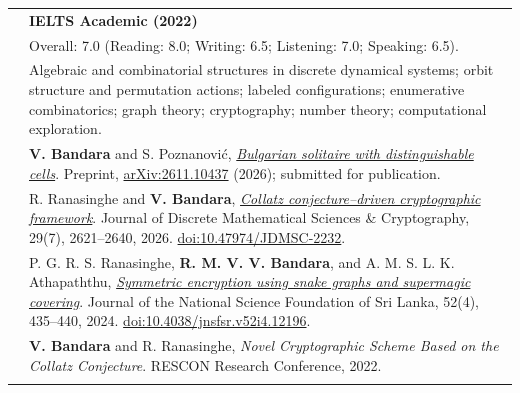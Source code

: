 \documentclass[letterpaper,11pt]{article}
\newcommand{\PreprintURL}{https://arxiv.org/pdf/2611.10437}
\newcommand{\cvspace}{\noalign{\vskip 6pt}}
\begin{document}
\begin{longtable}[t]{@{}>{\raggedright\arraybackslash}p{1.3in}>{\raggedright\arraybackslash}p{4.8in}@{}}
& \textbf{IELTS Academic (2022)} \\*
& Overall: 7.0 (Reading: 8.0; Writing: 6.5; Listening: 7.0; Speaking: 6.5). \\
\cvspace

\textbf{\color{OliveGreen}{Research Interests}}
& Algebraic and combinatorial structures in discrete dynamical systems;
orbit structure and permutation actions; labeled configurations;
enumerative combinatorics; graph theory; cryptography; number theory;
computational exploration. \\
\cvspace

\textbf{\color{OliveGreen}{Publications and Preprints}}
& \textbf{V. Bandara} and S. Poznanovi\'{c},
\href{\PreprintURL}{\emph{Bulgarian solitaire with distinguishable cells}}.
Preprint, \href{https://arxiv.org/abs/2611.10437}{arXiv:2611.10437} (2026); submitted for publication. \\
\cvspace

& R. Ranasinghe and \textbf{V. Bandara},
\href{https://doi.org/10.47974/JDMSC-2232}
{\emph{Collatz conjecture--driven cryptographic framework}}.
Journal of Discrete Mathematical Sciences \& Cryptography,
29(7), 2621--2640, 2026.
\href{https://doi.org/10.47974/JDMSC-2232}{doi:10.47974/JDMSC-2232}. \\
\cvspace

& P. G. R. S. Ranasinghe, \textbf{R. M. V. V. Bandara}, and
A. M. S. L. K. Athapaththu,
\href{https://doi.org/10.4038/jnsfsr.v52i4.12196}
{\emph{Symmetric encryption using snake graphs and supermagic covering}}.
Journal of the National Science Foundation of Sri Lanka,
52(4), 435--440, 2024.
\href{https://doi.org/10.4038/jnsfsr.v52i4.12196}{doi:10.4038/jnsfsr.v52i4.12196}. \\
\cvspace



& \textbf{V. Bandara} and R. Ranasinghe,
\emph{Novel Cryptographic Scheme Based on the Collatz Conjecture}.
RESCON Research Conference, 2022. \\
\cvspace


\end{longtable}
\end{document}
